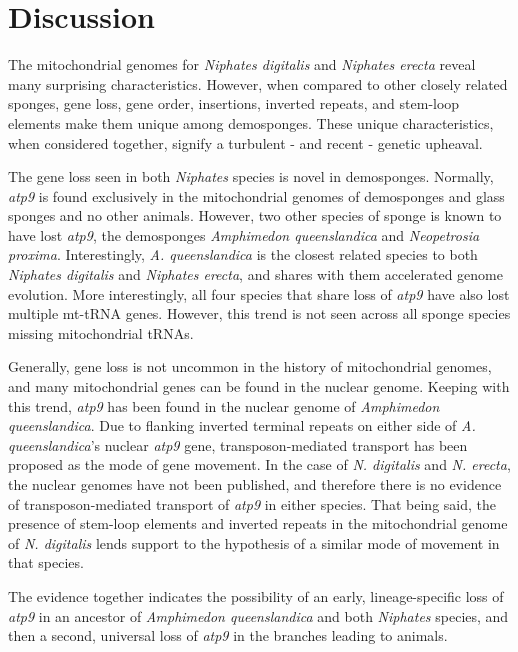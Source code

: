 \documentclass[../main.tex]{subfiles}
\begin{document}
\section{Discussion}

The mitochondrial genomes for \emph{Niphates digitalis} and \emph{Niphates erecta} reveal many surprising characteristics. However, when compared to other closely related sponges, gene loss, gene order, insertions, inverted repeats, and stem-loop elements make them unique among demosponges. These unique characteristics, when considered together, signify a turbulent - and recent - genetic upheaval. 

The gene loss seen in both \emph{Niphates} species is novel in demosponges. Normally, \emph{atp9} is found exclusively in the mitochondrial genomes of demosponges and glass sponges and no other animals. However, two other species of sponge is known to have lost \emph{atp9}, the demosponges \emph{Amphimedon queenslandica} and \emph{Neopetrosia proxima}. Interestingly, \emph{A. queenslandica} is the closest related species to both \emph{Niphates digitalis} and \emph{Niphates erecta}, and shares with them accelerated genome evolution. More interestingly, all four species that share loss of \emph{atp9} have also lost multiple mt-tRNA genes. However, this trend is not seen across all sponge species missing mitochondrial tRNAs.

Generally, gene loss is not uncommon in the history of mitochondrial genomes, and many mitochondrial genes can be found in the nuclear genome. Keeping with this trend, \emph{atp9} has been found in the nuclear genome of \emph{Amphimedon queenslandica}. Due to flanking inverted terminal repeats on either side of \emph{A. queenslandica}'s nuclear \emph{atp9} gene, transposon-mediated transport has been proposed as the mode of gene movement. In the case of \emph{N. digitalis} and \emph{N. erecta}, the nuclear genomes have not been published, and therefore there is no evidence of transposon-mediated transport of \emph{atp9} in either species. That being said, the presence of stem-loop elements and inverted repeats in the mitochondrial genome of \emph{N. digitalis} lends support to the hypothesis of a similar mode of movement in that species. 

The evidence together indicates the possibility of an early, lineage-specific loss of \emph{atp9} in an ancestor of \emph{Amphimedon queenslandica} and both \emph{Niphates} species, and then a second, universal loss of \emph{atp9} in the branches leading to animals. 
\end{document}
